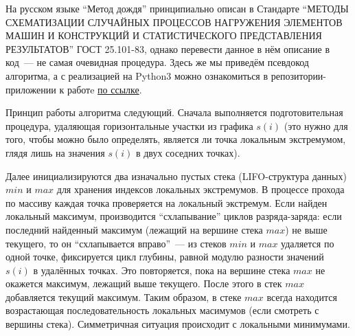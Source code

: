 \begin{enumerate}
На русском языке ``Метод дождя'' принципиально описан в Стандарте 
``МЕТОДЫ СХЕМАТИЗАЦИИ СЛУЧАЙНЫХ ПРОЦЕССОВ НАГРУЖЕНИЯ ЭЛЕМЕНТОВ МАШИН И КОНСТРУКЦИЙ И СТАТИСТИЧЕСКОГО ПРЕДСТАВЛЕНИЯ РЕЗУЛЬТАТОВ'' 
ГОСТ 25.101-83, однако перевести данное в нём описание в код~--- не самая очевидная процедура.
Здесь же мы приведём псевдокод алгоритма, а с реализацией на Python3 можно ознакомиться в репозитории-приложении к работe \hyperlink{https://github.com/niquepolice/master-thesis-code/blob/master/cycles.ipynb}{по ссылке}.

Принцип работы алгоритма следующий. 
Сначала выполняется подготовительная процедура, удаляющая горизонтальные участки из графика $s(i)$ (это нужно для того, чтобы можно было определять, является ли точка локальным экстремумом, глядя лишь на значения $s(i)$ в двух соседних точках).

Далее инициализируются два изначально пустых стека (LIFO-структура данных) $min$ и $max$ для хранения индексов локальных экстремумов.
В процессе прохода по массиву каждая точка проверяется на локальный экстремум.
Если найден локальный максимум, производится ``схлапывание'' циклов разряда-заряда: если последний найденный максимум (лежащий на вершине стека $max$) не выше текущего, то он ``схлапывается вправо''~--- из стеков $min$ и $max$ удаляется по одной точке, фиксируется цикл глубины, равной модулю разности значений $s(i)$ в удалённых точках.
Это повторяется, пока на вершине стека $max$ не окажется максимум, лежащий выше текущего. 
После этого в стек $max$ добавляется текущий максимум.
Таким образом, в стеке $max$ всегда находится возрастающая последовательность локальных масимумов (если смотреть с вершины стека).
Симметричная ситуация происходит с локальными минимумами. 


\begin{figure}[]
\centering
\begin{subfigure}[b]{0.45\textwidth}
    \centering
\end{subfigure}
\begin{subfigure}[b]{0.45\textwidth}
    \centering
\end{subfigure}
\end{figure}
\end{enumerate}
